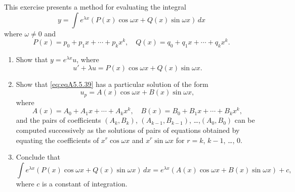 \documentclass{ximera}
\begin{document}
\begin{problem}\label{exer:5.5.39}
This exercise presents a method for evaluating the integral
$$
y=\int e^{\lambda x}\left(P(x)\cos \omega x+Q(x)\sin \omega x\right)\,dx
$$
where $\omega\ne0$ and
$$
P(x)=p_0+p_1x+\cdots+p_kx^k,\quad Q(x)=q_0+q_1x+\cdots+q_kx^k.
$$
\begin{enumerate}
\item %
Show that $y=e^{\lambda x}u$, where
\begin{equation}\label{eq:eqA5.5.39}
u'+\lambda u=P(x)\cos \omega x+Q(x)\sin \omega x.
\end{equation}
\item %
Show that \ref{eq:eqA5.5.39} has a particular solution of the form
$$
u_p=A(x)\cos \omega x+B(x)\sin \omega x,
$$
where
$$
A(x)=A_0+A_1x+\cdots+A_kx^k,\quad B(x)=B_0+B_1x+\cdots+B_kx^k,
$$
and  the pairs of coefficients
$(A_k,B_k)$, $(A_{k-1},B_{k-1})$, \dots,$(A_0,B_0)$
can be computed successively as the solutions of pairs of equations
obtained  by equating the coefficients
of $x^r\cos\omega x$ and $x^r\sin\omega x$ for $r=k$, $k-1$, \dots, $0$.
\item %
Conclude that
$$
\int e^{\lambda x}\left(P(x)\cos \omega x+Q(x)\sin \omega x\right)\,dx
= e^{\lambda x}\left(A(x)\cos \omega x+B(x)\sin \omega x\right) +c,
$$
where $c$ is a constant of integration.
\end{enumerate}
\end{problem}
\end{document}
